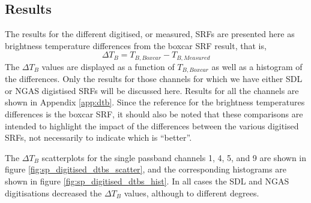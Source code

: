 \subsection{Results}
The results for the different digitised, or measured, SRFs are presented here as brightness temperature differences from the boxcar SRF result, that is,
\begin{equation}
  \Delta T_B = T_{B,Boxcar} - T_{B,Measured}
\end{equation}
The $\Delta T_B$ values are displayed as a function of $T_{B,Boxcar}$ as well as a histogram of the differences. Only the results for those channels for which we have either SDL or NGAS digistised SRFs will be discussed here. Results for all the channels are shown in Appendix \ref{app:dtb}. Since the reference for the brightness temperatures differences is the boxcar SRF, it should also be noted that these comparisons are intended to highlight the impact of the differences between the various digitised SRFs, not necessarily to indicate which is ``better''.

The $\Delta T_B$ scatterplots for the single passband channels 1, 4, 5, and 9 are shown in figure \ref{fig:sp_digitised_dtbs_scatter}, and the corresponding histograms are shown in figure \ref{fig:sp_digitised_dtbs_hist}. In all cases the SDL and NGAS digitisations decreased the $\Delta T_B$ values, although to different degrees.

